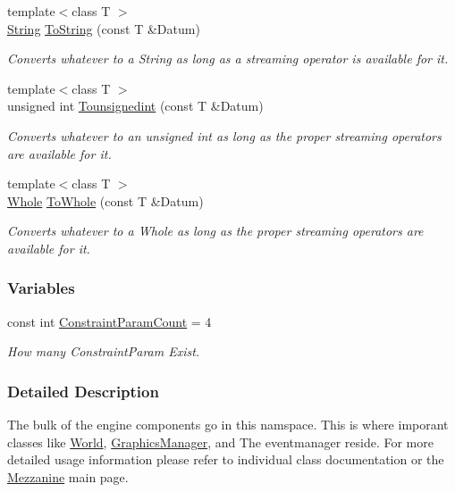 \begin{DoxyCompactItemize}
{\footnotesize template$<$class T $>$ }\\\hyperlink{namespaceMezzanine_acf9fcc130e6ebf08e3d8491aebcf1c86}{String} \hyperlink{namespaceMezzanine_a206e6571c4a738a16f9d103205c235f8}{ToString} (const T \&Datum)
\begin{DoxyCompactList}\small\item\em Converts whatever to a String as long as a streaming operator is available for it. \item\end{DoxyCompactList}\item 
{\footnotesize template$<$class T $>$ }\\unsigned int \hyperlink{namespaceMezzanine_a39068f48126065146fa64fe90e459382}{Tounsignedint} (const T \&Datum)
\begin{DoxyCompactList}\small\item\em Converts whatever to an unsigned int as long as the proper streaming operators are available for it. \item\end{DoxyCompactList}\item 
{\footnotesize template$<$class T $>$ }\\\hyperlink{namespaceMezzanine_adcbb6ce6d1eb4379d109e51171e2e493}{Whole} \hyperlink{namespaceMezzanine_a5df12bb5a875e3b8f8e28f2dd91a5304}{ToWhole} (const T \&Datum)
\begin{DoxyCompactList}\small\item\em Converts whatever to a Whole as long as the proper streaming operators are available for it. \item\end{DoxyCompactList}\end{DoxyCompactItemize}
\subsubsection*{Variables}
\begin{DoxyCompactItemize}
\item 
const int \hyperlink{namespaceMezzanine_affe44b22cef36683c2cc9025bf45b202}{ConstraintParamCount} = 4
\begin{DoxyCompactList}\small\item\em How many ConstraintParam Exist. \item\end{DoxyCompactList}\end{DoxyCompactItemize}


\subsubsection{Detailed Description}
The bulk of the engine components go in this namspace. This is where imporant classes like \hyperlink{classMezzanine_1_1World}{World}, \hyperlink{classMezzanine_1_1GraphicsManager}{GraphicsManager}, and The eventmanager reside. For more detailed usage information please refer to individual class documentation or the \hyperlink{index}{Mezzanine} main page. 

